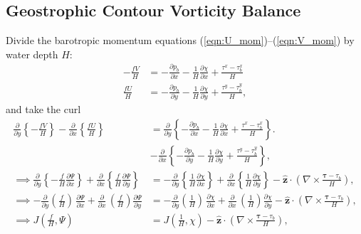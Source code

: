 \documentclass[10pt]{amsart}
\begin{document}
\subsection{Geostrophic Contour Vorticity Balance}
Divide the barotropic momentum equations (\ref{eqn:U_mom})--(\ref{eqn:V_mom}) by water depth $H$:
 \begin{align}
- \frac{f V}{H} & =  - \frac{\partial p_b}{\partial x} - \frac{1}{H} \frac{\partial \chi}{\partial x} + \frac{\tau^x - \tau^x_b}{H}   \\
\frac{f  U}{H} & = - \frac{\partial p_b}{\partial y} - \frac{1}{H} \frac{\partial \chi }{\partial y} + \frac{\tau^y - \tau^y_b}{H} ,
\end{align}
and take the curl
 \begin{align}
\frac{\partial}{\partial y} \left\{- \frac{f V}{H} \right\}  - \frac{\partial}{\partial x} \left\{\frac{f  U}{H} \right\} & = 
\frac{\partial}{\partial y} \left\{ - \frac{\partial p_b}{\partial x} - \frac{1}{H} \frac{\partial \chi}{\partial x}  + \frac{\tau^x - \tau^x_b}{H} \right\} \nonumber. \\
& -  \frac{\partial}{\partial x} \left\{ - \frac{\partial p_b}{\partial y} - \frac{1}{H} \frac{\partial \chi }{\partial y}  + \frac{\tau^y - \tau^y_b}{H} \right\}, \\
\implies
\frac{\partial}{\partial y} \left\{- \frac{f }{H} \frac{\partial \Psi}{\partial x} \right\}  + \frac{\partial}{\partial x} \left\{\frac{f }{H} \frac{\partial \Psi}{\partial y} \right\} & = 
- \frac{\partial}{\partial y} \left\{ \frac{1}{H} \frac{\partial \chi}{\partial x} \right\} + \frac{\partial}{\partial x} \left\{ \frac{1}{H} \frac{\partial \chi }{\partial y}  \right\}  - {\hat{\mathbf z}} \cdot \left( \nabla \times \frac{{\mathbf \tau - \tau_b}}{H} \right), \nonumber \\
\implies
- \frac{\partial}{\partial y} \left(\frac{f }{H} \right) \, \frac{\partial \Psi}{\partial x}  + \frac{\partial}{\partial x} \, \left( \frac{f }{H}  \right) \frac{\partial \Psi}{\partial y} & = 
- \frac{\partial}{\partial y} \left( \frac{1}{H} \right) \, \frac{\partial \chi}{\partial x} + \frac{\partial}{\partial x} \, \left( \frac{1}{H} \right) \frac{\partial \chi }{\partial y}   - {\hat{\mathbf z}} \cdot \left( \nabla \times \frac{{\mathbf \tau - \tau_b}}{H} \right), \label{eqn:GCVB0} \\
\implies
J\left( \frac{f}{H} , \Psi \right)  & =  J \left( \frac{1}{H}, \chi \right)
- {\hat{\mathbf z}} \cdot \left( \nabla \times \frac{{\mathbf \tau - \tau_b}}{H} \right) ,
\label{eqn:GCVB}
\end{align}
\end{document}
